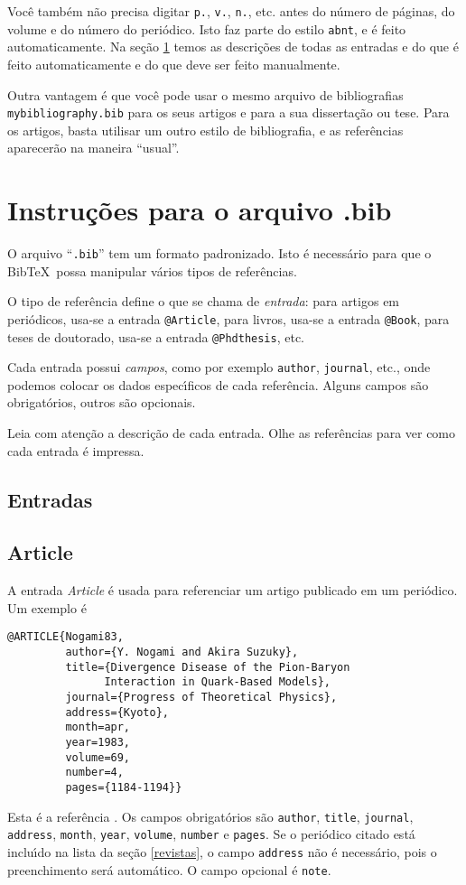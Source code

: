 \documentclass[a4paper,12pt]{article}
\newcommand{\ii}{\'{\i}}
\newcommand{\ca}{\c{c}\~ao}
\newcommand{\co}{\c{c}\~oes}
\newcommand{\enf}{\em}
\begin{document}
Voc\^e tamb\'em n\~ao precisa digitar \verb+p.+, \verb+v.+, \verb+n.+,
etc. antes do n\'umero de p\'aginas, do volume e do n\'umero
do peri\'odico. Isto faz parte do estilo \verb+abnt+, e
\'e feito automaticamente. Na se{\ca} \ref{entradas} temos as
descri{\co} de todas as entradas e do que \'e feito
automaticamente e do que deve ser feito manualmente.
 
Outra vantagem \'e que voc\^e pode usar o mesmo arquivo
de bibliografias
\verb+mybibliography.bib+ para os seus artigos e para a sua 
disserta{\ca} ou tese. Para os artigos, basta utilisar um outro
estilo de bibliografia, e as refer\^encias aparecer\~ao na maneira
``usual''.




\section{Instru{\co} para o arquivo .bib}
\label{entradas}


O arquivo ``\verb+.bib+'' tem um formato padronizado.
Isto \'e necess\'ario para que o Bib\TeX\ possa manipular
v\'arios tipos de refer\^encias.

O tipo de refer\^encia define o que se chama de {\it entrada}:
para artigos em peri\'odicos, usa-se a entrada \verb+@Article+, para
livros, usa-se a entrada \verb+@Book+, para teses de doutorado,
usa-se a entrada \verb+@Phdthesis+, etc. 

Cada entrada possui {\it campos},
como por exemplo \verb+author+, \verb+journal+, etc., onde podemos
colocar os dados espec{\ii}ficos de cada refer\^encia.
Alguns campos s\~ao obrigat\'orios, outros s\~ao opcionais.

Leia com aten{\ca} a descri{\ca} de cada entrada. 
Olhe as refer\^encias para ver como cada entrada \'e impressa.


\subsection{Entradas}


\subsection*{Article}

A entrada {\enf Article} \'e usada para referenciar um artigo publicado
em um peri\'odico.
Um exemplo \'e
\begin{verbatim}
@ARTICLE{Nogami83,
         author={Y. Nogami and Akira Suzuky}, 
         title={Divergence Disease of the Pion-Baryon
               Interaction in Quark-Based Models},
         journal={Progress of Theoretical Physics},
         address={Kyoto},
         month=apr,
         year=1983,
         volume=69,
         number=4,
         pages={1184-1194}}
\end{verbatim}
Esta \'e a refer\^encia \cite{Nogami83}.
Os campos obrigat\'orios s\~ao \verb+author+, \verb+title+, \verb+journal+, 
\verb+address+, \verb+month+, \verb+year+, \verb+volume+, \verb+number+ e
\verb+pages+. Se o peri\'odico citado est\'a inclu{\ii}do na lista
da se{\ca} \ref{revistas}, o campo \verb+address+ n\~ao \'e
necess\'ario, pois o preenchimento ser\'a autom\'atico.
O campo opcional \'e \verb+note+.
\end{document}

